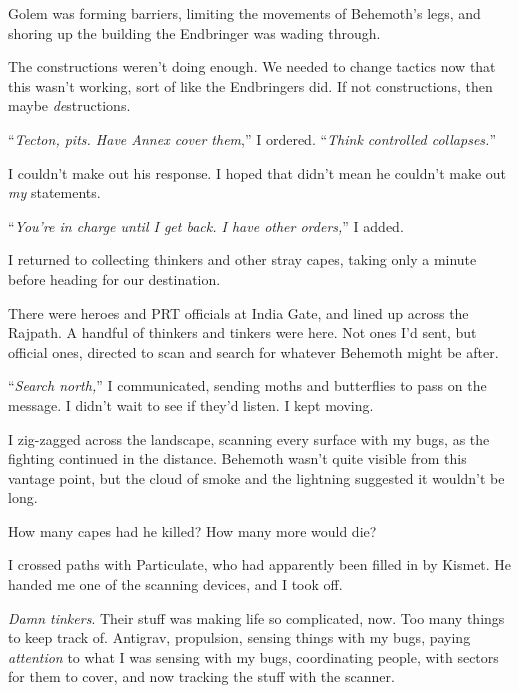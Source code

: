 Golem was forming barriers, limiting the movements of Behemoth's legs, and shoring up the building the Endbringer was wading through.



The constructions weren't doing enough.  We needed to change tactics now that this wasn't working, sort of like the Endbringers did.  If not constructions, then maybe \emph{de}structions.



``\emph{Tecton, pits.  Have Annex cover them},'' I ordered.  ``\emph{Think controlled collapses.}''



I couldn't make out his response.  I hoped that didn't mean he couldn't make out \emph{my} statements.



``\emph{You're in charge until I get back.  I have other orders,}'' I added.



I returned to collecting thinkers and other stray capes, taking only a minute before heading for our destination.



There were heroes and PRT officials at India Gate, and lined up across the Rajpath.  A handful of thinkers and tinkers were here.  Not ones I'd sent, but official ones, directed to scan and search for whatever Behemoth might be after.



``\emph{Search north,}'' I communicated, sending moths and butterflies to pass on the message.  I didn't wait to see if they'd listen.  I kept moving.



I zig-zagged across the landscape, scanning every surface with my bugs, as the fighting continued in the distance.  Behemoth wasn't quite visible from this vantage point, but the cloud of smoke and the lightning suggested it wouldn't be long.



How many capes had he killed?  How many more would die?



I crossed paths with Particulate, who had apparently been filled in by Kismet.  He handed me one of the scanning devices, and I took off.



\emph{Damn tinkers}.  Their stuff was making life so complicated, now.  Too many things to keep track of.  Antigrav, propulsion, sensing things with my bugs, paying \emph{attention} to what I was sensing with my bugs, coordinating people, with sectors for them to cover, and now tracking the stuff with the scanner.



